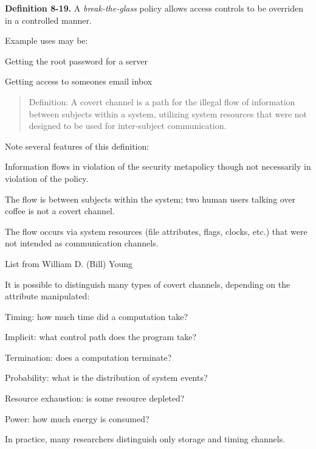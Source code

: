 \documentclass[Screen16to9,17pt]{foils}
\begin{document}





\begin{list1}
\item {\bf Definition 8-19.} A \emph{break-the-glass} policy allows access controls to be overriden in a controlled manner.
\item Example uses may be:
\item Getting the root password for a server
\item Getting access to someones email inbox
\end{list1}


\begin{quote}
Definition: A covert channel is a path for the illegal flow of
information between subjects within a system, utilizing system
resources that were not designed to be used for inter-subject
communication.
\end{quote}

\begin{list1}
\item Note several features of this definition:
\begin{list2}
\item Information flows in violation of the security metapolicy
though not necessarily in violation of the policy.
\item The flow is between subjects within the system; two human
users talking over coffee is not a covert channel.
\item The flow occurs via system resources (file attributes, flags,
clocks, etc.) that were not intended as communication
channels.
\end{list2}
\end{list1}

List from William D. (Bill) Young



\begin{list1}
\item It is possible to distinguish many types of covert channels,
depending on the attribute manipulated:
\begin{list2}
\item Timing: how much time did a computation take?
\item Implicit: what control path does the program take?
\item Termination: does a computation terminate?
\item Probability: what is the distribution of system events?
\item Resource exhaustion: is some resource depleted?
\item Power: how much energy is consumed?
\end{list2}
\item In practice, many researchers distinguish only storage and timing
channels.
\end{list1}
\end{document}
